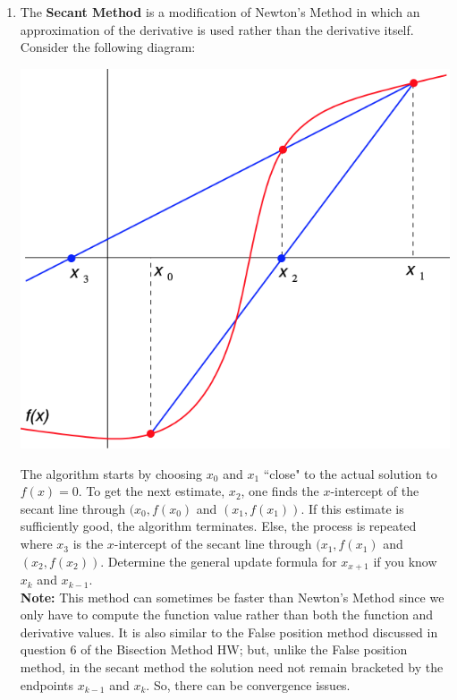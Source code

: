 \documentclass[12pt]{article}
\newif\ifans
\begin{document}
\begin{enumerate}
\begin{enumerate}
\end{enumerate}

\item The {\bf Secant Method} is a modification of Newton's Method in which an approximation of the derivative is used rather than the derivative itself. Consider the following diagram:

\begin{center}
\includegraphics[scale=0.5]{secant.png}
\end{center}

The algorithm starts by choosing $x_0$ and $x_1$ ``close" to the actual solution to $f(x)=0$.  To get the next estimate, $x_2$, one finds the $x$-intercept of the secant line through $(x_0,f(x_0)$ and $(x_1,f(x_1))$.  If this estimate is sufficiently good, the algorithm terminates.  Else, the process is repeated where $x_3$ is the $x$-intercept of the secant line through $(x_1,f(x_1)$ and $(x_2,f(x_2))$.  Determine the general update formula for $x_{x+1}$ if you know $x_k$ and $x_{k-1}$.\\

{\bf Note:} This method can sometimes be faster than Newton's Method since we only have to compute the function value rather than both the function and derivative values. It is also similar to the False position method discussed in question 6 of the Bisection Method HW; but, unlike the False position method, in the secant method the solution need not remain bracketed by the endpoints $x_{k-1}$ and $x_k$.  So, there can be convergence issues.

\ifans{\fbox{$x_{k+1} = x_k - \frac{f(x_k)(x_k-x_{k-1})}{f(x_k)-f(x_{k-1})}$}} \fi


\end{enumerate}
\end{document}
